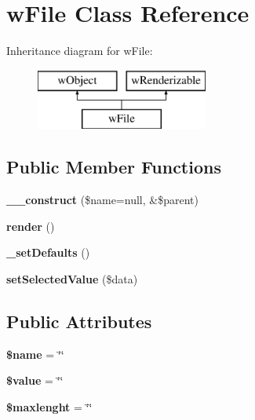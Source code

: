 \hypertarget{classwFile}{
\section{wFile Class Reference}
\label{classwFile}
}
Inheritance diagram for wFile:\begin{figure}[H]
\begin{center}
\leavevmode
\includegraphics[height=2.000000cm]{classwFile}
\end{center}
\end{figure}
\subsection*{Public Member Functions}
\begin{DoxyCompactItemize}
\item 
\hypertarget{classwFile_ae8cab8f05a7f3edc7f823a9cee93b801}{
{\bfseries \_\-\_\-construct} (\$name=null, \&\$parent)}
\label{classwFile_ae8cab8f05a7f3edc7f823a9cee93b801}

\item 
\hypertarget{classwFile_a9575007036cb44bee5cf726fc1a9441d}{
{\bfseries render} ()}
\label{classwFile_a9575007036cb44bee5cf726fc1a9441d}

\item 
\hypertarget{classwFile_a5a1cec28d059f7d4e700fa6456e14980}{
{\bfseries \_\-setDefaults} ()}
\label{classwFile_a5a1cec28d059f7d4e700fa6456e14980}

\item 
\hypertarget{classwFile_a021668e35de9bef5a80f588b7e6ef944}{
{\bfseries setSelectedValue} (\$data)}
\label{classwFile_a021668e35de9bef5a80f588b7e6ef944}

\end{DoxyCompactItemize}
\subsection*{Public Attributes}
\begin{DoxyCompactItemize}
\item 
\hypertarget{classwFile_afa68dc5e8738a79115f8f8098915ed4e}{
{\bfseries \$name} = \char`\"{}\char`\"{}}
\label{classwFile_afa68dc5e8738a79115f8f8098915ed4e}

\item 
\hypertarget{classwFile_a5d3a7e1abb181c5541813f3027d35608}{
{\bfseries \$value} = \char`\"{}\char`\"{}}
\label{classwFile_a5d3a7e1abb181c5541813f3027d35608}

\item 
\hypertarget{classwFile_a66c4306b6befacf893aba921b04d9db8}{
{\bfseries \$maxlenght} = \char`\"{}\char`\"{}}
\label{classwFile_a66c4306b6befacf893aba921b04d9db8}

\end{DoxyCompactItemize}


